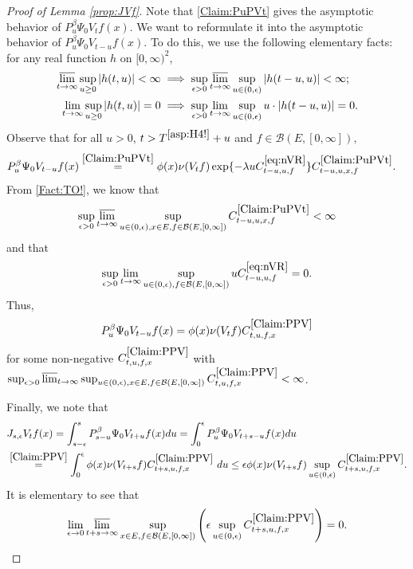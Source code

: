 \documentclass[12pt,a4paper]{amsart}
\numberwithin{equation}{section}
\theoremstyle{plain}
\theoremstyle{definition}
\theoremstyle{remark}
\begin{document}
\begin{proof}[Proof of Lemma \ref{prop:JVf}]
	Note that \eqref{Claim:PuPVt} gives the asymptotic behavior of $P_u^\beta \Psi_0 V_t f(x)$.
	We want to reformulate it into the asymptotic behavior  of $P_u^\beta \Psi_0 V_{t-u} f(x)$.	
	To do this, we use the following elementary facts: for any real function $h$ on $[0,\infty)^2$,
	\begin{align}\label{Fact:TO!}
	\varlimsup_{t\to \infty} \sup_{u\geq 0} |h(t,u)| < \infty & \implies \sup_{\epsilon > 0} \varlimsup_{t\to \infty} \sup_{u \in (0,\epsilon)} |h(t-u,u)| < \infty;
	\\ 	\lim_{t\to \infty} \sup_{u \geq 0} |h(t,u)| = 0 & \implies \sup_{\epsilon > 0} \lim_{t\to \infty} \sup_{u \in (0,\epsilon)} u\cdot |h(t-u,u)| = 0.
	\end{align}
	Observe that for all $u>0$, $t> T^{\eqref{asp:H4!}} + u$ and $f \in \mathcal B(E,[0,\infty])$,
	\begin{align}
	& P_u^\beta \Psi_0 V_{t-u} f(x)
	\overset{\eqref{Claim:PuPVt}}= \phi(x) \nu(V_{t}f) \exp\{-\lambda u C^{\eqref{eq:nVR}}_{t-u,u,f} \} C^{\eqref{Claim:PuPVt}}_{t-u,u,x,f}.
	\end{align}
	From \eqref{Fact:TO!}, we know that
	\[
	\sup_{\epsilon > 0}\varlimsup_{t\to \infty}
	\sup_{u\in (0,\epsilon), x\in E, f \in \mathcal B(E,[0,\infty])}
	C^{\eqref{Claim:PuPVt}}_{t-u,u,x,f} < \infty
	\]
	and that
	\[
	\sup_{\epsilon > 0}\lim_{t\to \infty}
	\sup_{u\in (0,\epsilon), f \in \mathcal B(E,[0,\infty])}
	uC^{\eqref{eq:nVR}}_{t-u,u,f} =0.
	\]
	Thus,
\begin{equation}
	\label{Claim:PPV}
	P_u^\beta \Psi_0 V_{t-u} f(x) = \phi(x)\nu(V_tf) C^{\eqref{Claim:PPV}}_{t,u,f,x}
\end{equation}
	for some non-negative $C^{\eqref{Claim:PPV}}_{t, u,f,x}$ with
	$\sup_{\epsilon > 0} \varlimsup_{t\to \infty}
	\sup_{u \in (0,\epsilon), x\in E, f \in \mathcal B(E,[0,\infty])}
	C^{\eqref{Claim:PPV}}_{t,u,f,x} < \infty$.

	Finally, we note that
	\begin{align}
	&J_{s,\epsilon}V_tf(x) = \int_{s-\epsilon}^s P_{s-u}^\beta \Psi_0 V_{t+u} f(x)du
	= \int_0^\epsilon P_u^\beta \Psi_0 V_{t+s - u}f(x) du
	\\& \overset{\eqref{Claim:PPV}}= \int_0^\epsilon \phi(x) \nu(V_{t+s}f) C^{\eqref{Claim:PPV}}_{t+s,u,f,x}~du
	\leq \epsilon \phi(x)\nu(V_{t+s}f) \sup_{u\in (0,\epsilon)} C^{\eqref{Claim:PPV}}_{t+s,u,f,x}.
	\end{align}
	It is elementary to see that \[\lim_{\epsilon \to 0}\varlimsup_{t+s \to \infty}
	\sup_{x\in E, f \in \mathcal B(E,[0,\infty])}
	\left(\epsilon \sup_{u\in (0,\epsilon)} C^{\eqref{Claim:PPV}}_{t+s,u,f,x}\right) = 0.\qedhere\]
\end{proof}
\end{document}
